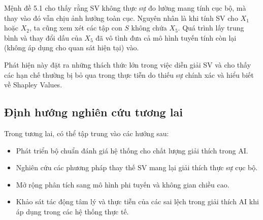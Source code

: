 \documentclass[12pt, a4paper]{article}
\begin{document}
Mệnh đề 5.1 cho thấy rằng SV không thực sự đo lường mang tính cục bộ, mà thay vào đó vẫn chịu ảnh hưởng toàn cục. Nguyên nhân là khi tính SV cho $X_1$ hoặc $X_2$, ta cũng xem xét các tập con $S$ không chứa $X_5$. Quá trình lấy trung bình và thay đổi dấu của $X_5$ đã vô tình đưa cả mô hình tuyến tính còn lại (không áp dụng cho quan sát hiện tại) vào. 

Phát hiện này đặt ra những thách thức lớn trong việc diễn giải SV và cho thấy các hạn chế thường bị bỏ qua trong thực tiễn do thiếu sự chính xác và hiểu biết về Shapley Values.

\subsection{Định hướng nghiên cứu tương lai}

Trong tương lai, có thể tập trung vào các hướng sau:
\begin{itemize}
    \item Phát triển bộ chuẩn đánh giá hệ thống cho chất lượng giải thích trong AI. 
    \item Nghiên cứu các phương pháp thay thế SV mang lại giải thích thực sự cục bộ. 
    \item Mở rộng phân tích sang mô hình phi tuyến và không gian chiều cao. 
    \item Khảo sát tác động tâm lý và thực tiễn của các sai lệch trong giải thích AI khi áp dụng trong các hệ thống thực tế. 
\end{itemize}
\end{document}
